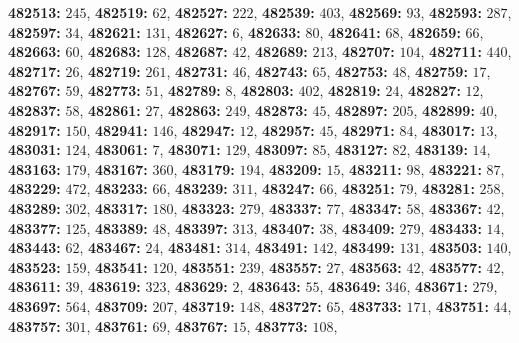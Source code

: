 \textsf{\bfseries 482513:} $245$, \textsf{\bfseries 482519:} $62$, \textsf{\bfseries 482527:} $222$, \textsf{\bfseries 482539:} $403$, \textsf{\bfseries 482569:} $93$, \textsf{\bfseries 482593:} $287$, \textsf{\bfseries 482597:} $34$, \textsf{\bfseries 482621:} $131$, \textsf{\bfseries 482627:} $6$, \textsf{\bfseries 482633:} $80$, \textsf{\bfseries 482641:} $68$, \textsf{\bfseries 482659:} $66$, \textsf{\bfseries 482663:} $60$, \textsf{\bfseries 482683:} $128$, \textsf{\bfseries 482687:} $42$, \textsf{\bfseries 482689:} $213$, \textsf{\bfseries 482707:} $104$, \textsf{\bfseries 482711:} $440$, \textsf{\bfseries 482717:} $26$, \textsf{\bfseries 482719:} $261$, \textsf{\bfseries 482731:} $46$, \textsf{\bfseries 482743:} $65$, \textsf{\bfseries 482753:} $48$, \textsf{\bfseries 482759:} $17$, \textsf{\bfseries 482767:} $59$, \textsf{\bfseries 482773:} $51$, \textsf{\bfseries 482789:} $8$, \textsf{\bfseries 482803:} $402$, \textsf{\bfseries 482819:} $24$, \textsf{\bfseries 482827:} $12$, \textsf{\bfseries 482837:} $58$, \textsf{\bfseries 482861:} $27$, \textsf{\bfseries 482863:} $249$, \textsf{\bfseries 482873:} $45$, \textsf{\bfseries 482897:} $205$, \textsf{\bfseries 482899:} $40$, \textsf{\bfseries 482917:} $150$, \textsf{\bfseries 482941:} $146$, \textsf{\bfseries 482947:} $12$, \textsf{\bfseries 482957:} $45$, \textsf{\bfseries 482971:} $84$, \textsf{\bfseries 483017:} $13$, \textsf{\bfseries 483031:} $124$, \textsf{\bfseries 483061:} $7$, \textsf{\bfseries 483071:} $129$, \textsf{\bfseries 483097:} $85$, \textsf{\bfseries 483127:} $82$, \textsf{\bfseries 483139:} $14$, \textsf{\bfseries 483163:} $179$, \textsf{\bfseries 483167:} $360$, \textsf{\bfseries 483179:} $194$, \textsf{\bfseries 483209:} $15$, \textsf{\bfseries 483211:} $98$, \textsf{\bfseries 483221:} $87$, \textsf{\bfseries 483229:} $472$, \textsf{\bfseries 483233:} $66$, \textsf{\bfseries 483239:} $311$, \textsf{\bfseries 483247:} $66$, \textsf{\bfseries 483251:} $79$, \textsf{\bfseries 483281:} $258$, \textsf{\bfseries 483289:} $302$, \textsf{\bfseries 483317:} $180$, \textsf{\bfseries 483323:} $279$, \textsf{\bfseries 483337:} $77$, \textsf{\bfseries 483347:} $58$, \textsf{\bfseries 483367:} $42$, \textsf{\bfseries 483377:} $125$, \textsf{\bfseries 483389:} $48$, \textsf{\bfseries 483397:} $313$, \textsf{\bfseries 483407:} $38$, \textsf{\bfseries 483409:} $279$, \textsf{\bfseries 483433:} $14$, \textsf{\bfseries 483443:} $62$, \textsf{\bfseries 483467:} $24$, \textsf{\bfseries 483481:} $314$, \textsf{\bfseries 483491:} $142$, \textsf{\bfseries 483499:} $131$, \textsf{\bfseries 483503:} $140$, \textsf{\bfseries 483523:} $159$, \textsf{\bfseries 483541:} $120$, \textsf{\bfseries 483551:} $239$, \textsf{\bfseries 483557:} $27$, \textsf{\bfseries 483563:} $42$, \textsf{\bfseries 483577:} $42$, \textsf{\bfseries 483611:} $39$, \textsf{\bfseries 483619:} $323$, \textsf{\bfseries 483629:} $2$, \textsf{\bfseries 483643:} $55$, \textsf{\bfseries 483649:} $346$, \textsf{\bfseries 483671:} $279$, \textsf{\bfseries 483697:} $564$, \textsf{\bfseries 483709:} $207$, \textsf{\bfseries 483719:} $148$, \textsf{\bfseries 483727:} $65$, \textsf{\bfseries 483733:} $171$, \textsf{\bfseries 483751:} $44$, \textsf{\bfseries 483757:} $301$, \textsf{\bfseries 483761:} $69$, \textsf{\bfseries 483767:} $15$, \textsf{\bfseries 483773:} $108$, 
